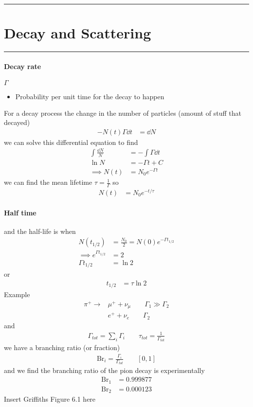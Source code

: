 \documentclass[../main.tex]{subfiles}
\begin{document}
\hrule
\section{Decay and Scattering}
\hrule \vspace{10px}


\paragraph*{Decay rate} $\Gamma$
\begin{itemize}
    \item Probability per unit time for the decay to happen
\end{itemize}
For a decay process the change in the number of particles (amount of stuff that decayed)
\begin{align*}
    -N(t) \Gamma \dd t &= \dd N
\end{align*}
we can solve this differential equation to find
\begin{align*}
    \int \frac{\dd N}{N} &= -\int \Gamma \dd t \\
    \ln N &= -\Gamma t + C \\
    \implies N(t) &= N_0 e^{-\Gamma t}
\end{align*}
we can find the mean lifetime $\tau = \frac{1}{\Gamma}$ so
\begin{align*}
    N(t) &= N_0 e^{-t/\tau}
\end{align*}
\paragraph*{Half time}
and the half-life is when
\begin{align*}
    N(t_{1/2}) &= \frac{N_0}{2} = N(0) e^{-\Gamma t_{1/2}} \\
    \implies e^{\Gamma t_{1/2}} &= 2 \\
    \Gamma t_{1/2} &= \ln 2
\end{align*}
or 
\begin{align*}
    t_{1/2} &= \tau \ln 2
\end{align*}
Example
\begin{align*}
    \pi^+ \to &\mu^+ + \nu_\mu \qquad \Gamma_1 \gg \Gamma_2 \\
    &e^+ + \nu_e \qquad \Gamma_2
\end{align*}
and
\begin{align*}
    \Gamma_{tot} = \sum_i \Gamma_i \qquad \tau_{tot} = \frac{1}{\Gamma_{tot}}
\end{align*}
we have a branching ratio (or fraction)
\begin{align*}
    \text{Br}_i = \frac{\Gamma_i}{\Gamma_{tot}} \qquad [0,1]
\end{align*}
and we find the branching ratio of the pion decay is experimentally
\begin{align*}
    \text{Br}_1 &= 0.999877 \\
    \text{Br}_2 &= 0.000123
\end{align*}
Insert Griffiths Figure 6.1 here
\end{document}
